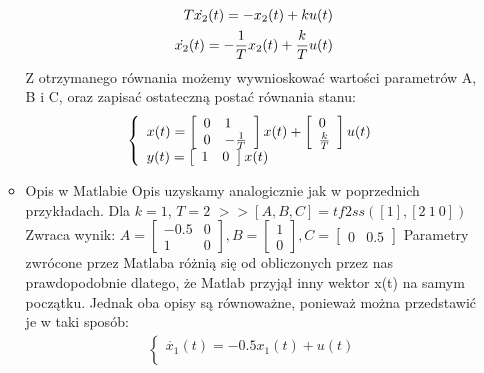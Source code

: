 \documentclass[a4paper,10pt]{article}
\begin{document}
\begin{itemize}
\begin{itemize}
\begin{eqnarray}
		\nonumber T\dot{x_{2}}(t) = - x_{2}(t) + ku(t)\\
		\dot{x_{2}}(t) = -{1 \over T}x_{2}(t) + {k \over T}u(t)
	\end{eqnarray}
Z otrzymanego równania możemy wywnioskować wartości parametrów A, B i C, oraz zapisać ostateczną postać równania stanu:
	\begin{eqnarray}
		\left\{
			\begin{array}{l}
				x(t) = \left[ 
			\begin{array}{ll}
				0 & 1\\
				0 & -{1 \over T}
			\end{array}
		\right] x(t) + \left[ 
			\begin{array}{l}
				0\\
				{k \over T}
			\end{array}
		\right] u(t)\\
				y(t) = \left[ 
			\begin{array}{ll}
				1 & 0
			\end{array}
		\right]x(t)
			\end{array} \right.
	\end{eqnarray}
\item Opis w Matlabie
\newline Opis uzyskamy analogicznie jak w poprzednich przykładach.
\newline\newline Dla $k=1$, $T=2$
\newline $>>[A,B,C] = tf2ss([1], [2 \ 1 \ 0])$
\newline Zwraca wynik:
$A = \left[ \begin{array}{ll} -0.5 & 0\\ 1 & 0 \end{array} \right], B = \left[ \begin{array}{l} 1\\ 0 \end{array} \right], C = \left[ \begin{array}{ll} 0 & 0.5 \end{array} \right]$
\newline \newline Parametry zwrócone przez Matlaba różnią się od obliczonych przez nas prawdopodobnie dlatego, że Matlab przyjął inny wektor x(t) na samym początku. Jednak oba opisy są równoważne, ponieważ można przedstawić je w taki sposób:
	\begin{eqnarray}
		\nonumber \left\{ \begin{array}{l}
			\dot{x_{1}}(t) = -0.5x_{1}(t) + u(t)\\

\end{array}
\end{eqnarray}
\end{itemize}
\end{itemize}
\end{document}
